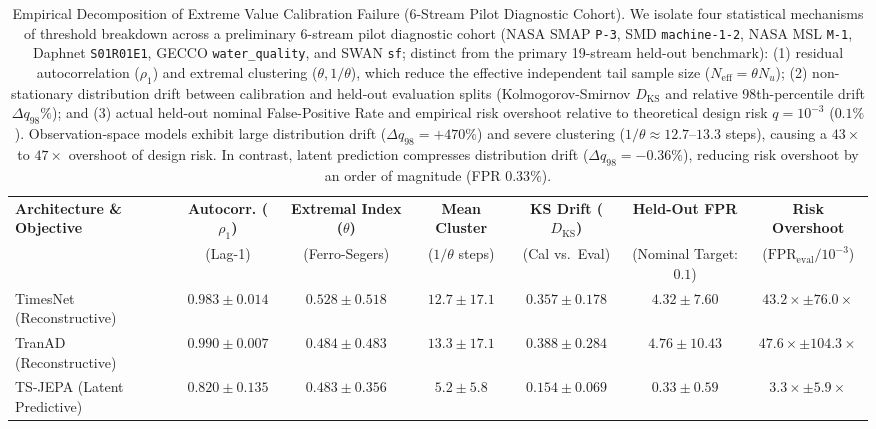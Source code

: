 \begin{table}[t]
\centering
\caption{Empirical Decomposition of Extreme Value Calibration Failure (6-Stream Pilot Diagnostic Cohort). We isolate four statistical mechanisms of threshold breakdown across a preliminary 6-stream pilot diagnostic cohort (NASA SMAP \texttt{P-3}, SMD \texttt{machine-1-2}, NASA MSL \texttt{M-1}, Daphnet \texttt{S01R01E1}, GECCO \texttt{water\_quality}, and SWAN \texttt{sf}; distinct from the primary 19-stream held-out benchmark): (1) residual autocorrelation ($\rho_1$) and extremal clustering ($\theta, 1/\theta$), which reduce the effective independent tail sample size ($N_{\text{eff}} = \theta N_u$); (2) non-stationary distribution drift between calibration and held-out evaluation splits (Kolmogorov-Smirnov $D_{\text{KS}}$ and relative 98th-percentile drift $\Delta q_{98}\%$); and (3) actual held-out nominal False-Positive Rate and empirical risk overshoot relative to theoretical design risk $q=10^{-3}$ ($0.1\%$). Observation-space models exhibit large distribution drift ($\Delta q_{98} = +470\%$) and severe clustering ($1/\theta \approx 12.7\text{--}13.3$ steps), causing a $43\times$ to $47\times$ overshoot of design risk. In contrast, latent prediction compresses distribution drift ($\Delta q_{98} = -0.36\%$), reducing risk overshoot by an order of magnitude (FPR $0.33\%$).}
\label{tab:evt_failure_decomposition}
\small
\scriptsize
\setlength{\tabcolsep}{2.5pt}
\begin{tabular}{@{}lcccccc@{}} \toprule
\textbf{Architecture \& Objective} & \textbf{Autocorr. ($\rho_1$)} & \textbf{Extremal Index ($\theta$)} & \textbf{Mean Cluster} & \textbf{KS Drift ($D_{\text{KS}}$)} & \textbf{Held-Out FPR} & \textbf{Risk Overshoot} \\
 & (Lag-1) & (Ferro-Segers) & ($1/\theta$ steps) & (Cal vs.\ Eval) & (Nominal Target: $0.1$) & ($\text{FPR}_{\text{eval}} / 10^{-3}$) \\ \midrule
TimesNet (Reconstructive) & $0.983 \pm 0.014$ & $0.528 \pm 0.518$ & $12.7 \pm 17.1$ & $0.357 \pm 0.178$ & $4.32 \pm 7.60$ & $43.2\times \pm 76.0\times$ \\
TranAD (Reconstructive) & $0.990 \pm 0.007$ & $0.484 \pm 0.483$ & $13.3 \pm 17.1$ & $0.388 \pm 0.284$ & $4.76 \pm 10.43$ & $47.6\times \pm 104.3\times$ \\
TS-JEPA (Latent Predictive) & $0.820 \pm 0.135$ & $0.483 \pm 0.356$ & $5.2 \pm 5.8$ & $0.154 \pm 0.069$ & $0.33 \pm 0.59$ & $3.3\times \pm 5.9\times$ \\
\bottomrule
\end{tabular}
\end{table}
